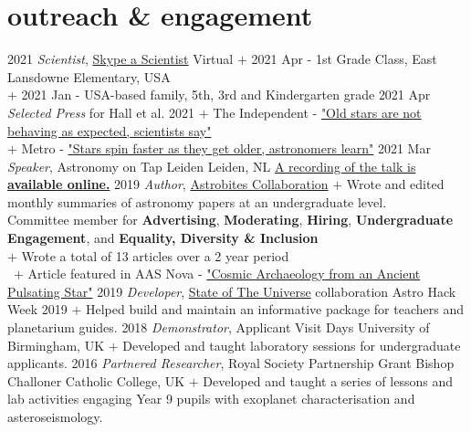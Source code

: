 \documentclass[letterpaper]{k-cv} %
\begin{document}
\section{\color{c1}outreach \& engagement}
\begin{entrylist}
	\centry
	{2021}
	{\emph{Scientist}, \href{https://www.skypeascientist.com/}{Skype a Scientist}}
	{Virtual}
	{$+$ 2021 Apr - 1st Grade Class, East Lansdowne Elementary, USA\\
		$+$ 2021 Jan - USA-based family, 5th, 3rd and Kindergarten grade
	 }
	\centry
	{2021 Apr}
	{\emph{Selected Press} for \textcolor{c1}{Hall et al. 2021}}
	{}
	{$+$ The Independent - \href{https://www.independent.co.uk/life-style/gadgets-and-tech/star-spinning-astronomy-seismology-b1835897.html}{"Old stars are not behaving as expected, scientists say"}\\
	$+$ Metro - \href{https://metro.co.uk/2021/04/22/stars-spin-faster-as-they-get-older-astronomers-learn-14453841/}{"Stars spin faster as they get older, astronomers learn"}
	} 
	\centry
	{2021 Mar}
	{\emph{Speaker}, Astronomy on Tap Leiden}
	{Leiden, NL}
	{\href{https://youtu.be/lreGHVBKfjo?t=1925}{A recording of the talk is \textbf{\textcolor{c1}{available online.}}}}	
	\centry
	{2019 }
	{\emph{Author}, \href{https://astrobites.org/}{Astrobites Collaboration}}
	{}
	{$+$ Wrote and edited monthly summaries of astronomy papers at an undergraduate level. \\ Committee member for \textbf{\textcolor{c1}{Advertising}}, \textbf{\textcolor{c1}{Moderating}}, \textbf{\textcolor{c1}{Hiring}}, \textbf{\textcolor{c1}{Undergraduate Engagement}}, and \textbf{\textcolor{c1}{Equality, Diversity \& Inclusion}}\\
	$+$ Wrote a total of 13 articles over a 2 year period\\\ 
	$+$ Article featured in AAS Nova - \href{https://aasnova.org/2019/10/22/cosmic-archaeology-from-an-ancient-pulsating-star/}{"Cosmic Archaeology from an Ancient Pulsating Star"}}
	\centry
	{2019}
	{\emph{Developer}, \href{https://github.com/ojhall94/stateoftheuniverse}{State of The Universe} collaboration}
	{Astro Hack Week 2019}
	{$+$ Helped build and maintain an informative package for teachers and planetarium guides.}
	\centry
	{2018 }
	{\emph{Demonstrator}, Applicant Visit Days}
	{University of Birmingham, UK}
	{$+$ Developed and taught laboratory sessions for undergraduate applicants.}
	\centry
	{2016 }
	{\emph{Partnered Researcher}, \textcolor{c1}{Royal Society Partnership Grant}}
	{Bishop Challoner Catholic College, UK}
	{$+$ Developed and taught a series of lessons and lab activities engaging Year 9 pupils with exoplanet characterisation and asteroseismology.}
\end{entrylist}
\end{document}

